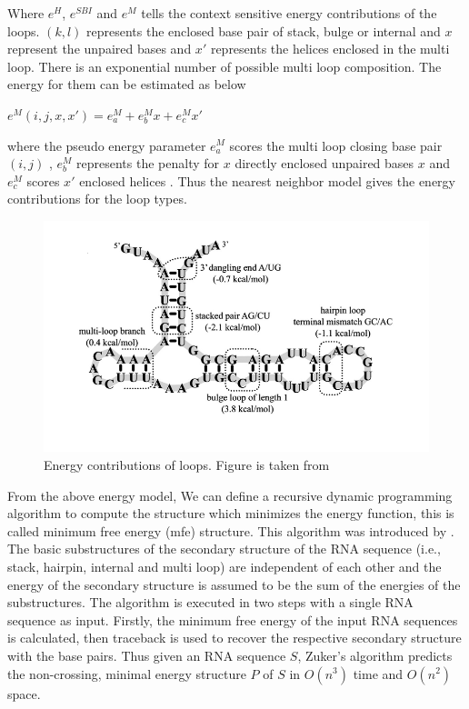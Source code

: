 \documentclass[twoside,a4paper]{report}
\numberwithin{equation}{section}
\begin{document}
 	 Where $e^H$, $e^{SBI}$ and $e^M$ tells the context sensitive energy contributions of the loops. $(k,l)$ represents the enclosed base pair of stack, bulge or internal and $x$ represent the unpaired bases and $x'$ represents the helices enclosed in the multi loop. There is an exponential number of possible multi loop composition. The energy for them can be estimated as below \\
 	 \begin{center}
 	 $e^M(i,j,x,x')= e^M_a+e^M_bx+e^M_cx'$\\
 	\end{center}
 	 where the pseudo energy parameter $e^M_a$ scores the multi loop closing base pair $(i,j)$ , $e^M_b$ represents the penalty for $x$ directly enclosed unpaired bases $x$ and $e^M_c$ scores $x'$ enclosed helices .
 	 Thus the nearest neighbor model gives the energy contributions for the loop types. \\
 	 
 	 \begin{figure}[h]
 	 	\includegraphics[width=0.9\linewidth]{energy}
 	 	\centering
 	 	\caption{Energy contributions of loops. Figure is taken from \citep{andronescu2010computational}}
 	 	\label{fig:energycontribution}
 	 \end{figure}
 	 
 	 
 	 From the above energy model, We can define a recursive dynamic programming algorithm to compute the structure which minimizes the energy function, this is called minimum free energy (mfe) structure. This algorithm was introduced by \citet{zuker1981optimal}.\\
 	 
 	 The basic substructures of the secondary structure of the RNA sequence (i.e., stack, hairpin, internal and multi loop) are independent of each other and the energy of the secondary structure is assumed to be the sum of the energies of the substructures. The algorithm is executed in two steps with a single RNA sequence as input. Firstly, the minimum free energy of the input RNA sequences is calculated, then traceback is used to recover the respective secondary structure with the base pairs. Thus given an RNA sequence $S$, Zuker’s algorithm predicts the non-crossing, minimal energy structure $P$ of $S$ in $O(n^3)$ time and $O(n^2)$ space.\\
 	 
\end{document}
